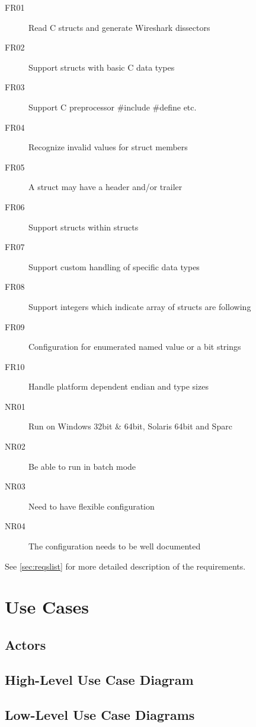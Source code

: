 \begin{description}
    \item[FR01] Read C structs and generate Wireshark dissectors
	\item[FR02] Support structs with basic C data types
	\item[FR03] Support C preprocessor \#include \#define etc.
	\item[FR04] Recognize invalid values for struct members
	\item[FR05] A struct may have a header and/or trailer
	\item[FR06] Support structs within structs
	\item[FR07] Support custom handling of specific data types
	\item[FR08] Support integers which indicate array of structs are following
	\item[FR09] Configuration for enumerated named value or a bit strings
	\item[FR10] Handle platform dependent endian and type sizes
	\item[NR01] Run on Windows 32bit \& 64bit, Solaris 64bit and Sparc
	\item[NR02] Be able to run in batch mode
	\item[NR03] Need to have flexible configuration
	\item[NR04] The configuration needs to be well documented
\end{description}

See \autoref{sec:reqslist} for more detailed description of the
requirements.

\section{Use Cases}
\label{sec:usecases}

\subsection{Actors}

\subsection{High-Level Use Case Diagram}

\subsection{Low-Level Use Case Diagrams}


